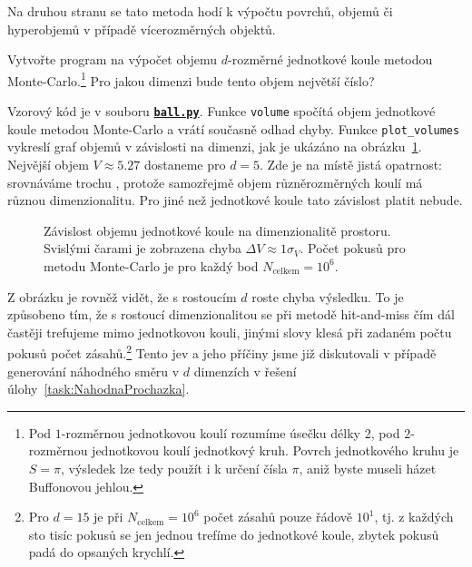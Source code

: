 \documentclass[a4paper,11pt,twoside]{article}
\def\code#1{\textnormal{\texttt{#1}}}
\def\ghfile#1#2{\textnormal{\textbf{\texttt{\href{https://github.com/PavelStransky/PCInPhysics/blob/main/#1#2}{#2}}}}}
\theoremstyle{red}
\theoremstyle{green}
\begin{document}
            Na druhou stranu se tato metoda hodí k výpočtu povrchů, objemů či hyperobjemů v případě vícerozměrných objektů.
            
            \begin{task}
                Vytvořte program na výpočet objemu $d$-rozměrné jednotkové koule metodou Monte-Car\-lo.\footnote{
                    Pod $1$-rozměrnou jednotkovou koulí rozumíme úsečku délky 2, pod $2$-rozměrnou jednotkovou koulí jednotkový kruh.
                    Povrch jednotkového kruhu je $S=\pi$, výsledek lze tedy použít i k určení čísla $\pi$, aniž byste museli házet Buffonovou jehlou.
                }
                Pro jakou dimenzi bude tento objem největší číslo?
            \end{task}
        
            \begin{solution}
                Vzorový kód je v souboru \ghfile{python/montecarlo/}{ball.py}.
                Funkce \code{volume} spočítá objem jednotkové koule metodou Monte-Carlo a vrátí současně odhad chyby.
                Funkce \code{plot_volumes} vykreslí graf objemů v závislosti na dimenzi, jak je ukázáno na obrázku~\ref{fig:VolumeBall}.
                Nejvější objem $V\approx5.27$ dostaneme pro $d=5$.
                Zde je na místě jistá opatrnost: srovnáváme trochu , protože samozřejmě objem různěrozměrných koulí má různou dimenzionalitu.
                Pro jiné než jednotkové koule tato závislost platit nebude.

                \begin{figure}[!htbp]
                    \centering{}
                    \caption{
                        \protect\small
                        Závislost objemu jednotkové koule na dimenzionalitě prostoru.
                        Svislými čarami je zobrazena chyba $\Delta V\approx1\sigma_{V}$.
                        Počet pokusů pro metodu Monte-Carlo je pro každý bod $N_{\text{celkem}}=10^{6}$.
                    }
                    \label{fig:VolumeBall}
                \end{figure}
    
                Z obrázku je rovněž vidět, že s rostoucím $d$ roste chyba výsledku.
                To je způsobeno tím, že s rostoucí dimenzionalitou se při metodě hit-and-miss čím dál častěji trefujeme mimo jednotkovou kouli, jinými slovy klesá při zadaném počtu pokusů počet zásahů.\footnote{
                    Pro $d=15$ je při $N_{\text{celkem}}=10^6$ počet zásahů pouze řádově $10^1$, tj. z každých sto tisíc pokusů se jen jednou trefíme do jednotkové koule, zbytek pokusů padá do  opsaných krychlí.
                }
                Tento jev a jeho příčiny jsme již diskutovali v případě generování náhodného směru v $d$ dimenzích v řešení úlohy~\ref{task:NahodnaProchazka}.
            \end{solution}
\end{document}
